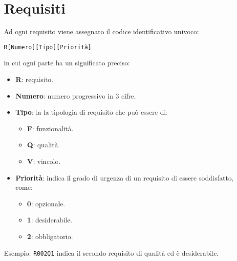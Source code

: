 \section{Requisiti}
Ad ogni requisito viene assegnato il codice identificativo univoco:
	\begin{center}
		\texttt{R[Numero][Tipo][Priorità]} 
	\end{center} 
	in cui ogni parte ha un significato preciso:
	\begin{itemize}
		\item \textbf{R}: requisito.
		\item \textbf{Numero}: numero progressivo in 3 cifre.
		\item \textbf{Tipo}: la la tipologia di requisito che può essere di:
		\begin{itemize}
			\item \textbf{F}: funzionalità.
			\item \textbf{Q}: qualità.
			\item \textbf{V}: vincolo.
		\end{itemize}
		\item \textbf{Priorità}: indica il grado di urgenza di un requisito di essere soddisfatto, come:
		\begin{itemize}
			\item \textbf{0}: opzionale.
			\item \textbf{1}: desiderabile.
			\item \textbf{2}: obbligatorio.
		\end{itemize}
	\end{itemize}
	
	Esempio: \texttt{R002Q1} indica il secondo requisito di qualità ed è desiderabile.
	
	

